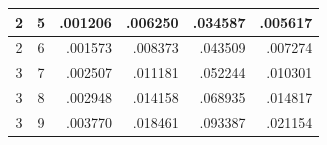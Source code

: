 \begin{table}
\begin{tabular}{|c|c|r|r|r|r|}
	2                                                        & 5                                                       & .001206                         & .006250                                                                              & .034587                                                                                 & .005617                                                                      \\ \hline
	2                                                        & 6                                                       & .001573                         & .008373                                                                              & .043509                                                                                 & .007274                                                                      \\ \hline
	3                                                        & 7                                                       & .002507                         & .011181                                                                              & .052244                                                                                 & .010301                                                                      \\ \hline
	3                                                        & 8                                                       & .002948                         & .014158                                                                              & .068935                                                                                 & .014817                                                                      \\ \hline
	3                                                        & 9                                                       & .003770                         & .018461                                                                              & .093387                                                                                 & .021154                                                                      \\ \hline
	\end{tabular}
\end{table}


